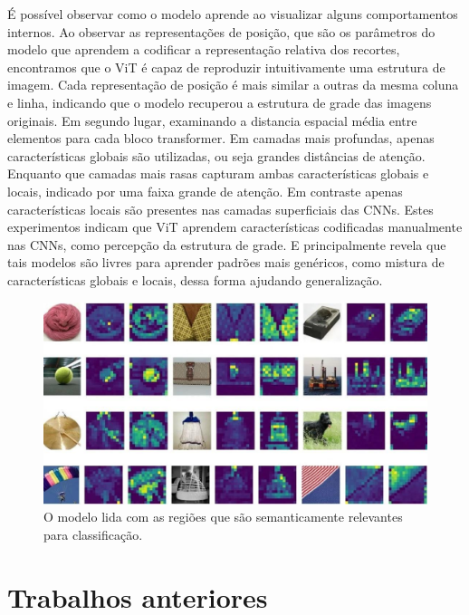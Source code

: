 É possível observar como o modelo aprende ao visualizar alguns comportamentos internos. Ao observar as representações de posição, que são os parâmetros do modelo que aprendem a codificar a representação relativa dos recortes, encontramos que o ViT é capaz de reproduzir intuitivamente uma estrutura de imagem. Cada representação de posição é mais similar a outras da mesma coluna e linha, indicando que o modelo recuperou a estrutura de grade das imagens originais. Em segundo lugar, examinando a distancia espacial média entre elementos para cada bloco transformer. Em camadas mais profundas, apenas características globais são utilizadas, ou seja grandes distâncias de atenção. Enquanto que camadas mais rasas capturam ambas características globais e locais, indicado por uma faixa grande de atenção. Em contraste apenas características locais são presentes nas camadas superficiais das CNNs. Estes experimentos indicam que ViT aprendem características codificadas manualmente nas CNNs, como percepção da estrutura de grade. E principalmente revela que tais modelos são livres para aprender padrões mais genéricos, como mistura de características globais e locais, dessa forma ajudando generalização.
 

\begin{figure}[!ht]
    \centering
    \includegraphics[width=\columnwidth]{
        Imagens/visualizing-attention-vit.jpg
    }
    \caption{
O modelo lida com as regiões que são semanticamente relevantes para classificação. \cite{ViTvsResNets}
        }
    \label{fig:ViTVisualizationAttention}
\end{figure}



\section{Trabalhos anteriores}\label{sec:Cap2_revisao_literatura}

